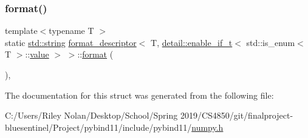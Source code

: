 \subsubsection{\texorpdfstring{format()}{format()}}
{\footnotesize\ttfamily template$<$typename T $>$ \\
static \mbox{\hyperlink{_s_d_l__opengl__glext_8h_ab4ccfaa8ab0e1afaae94dc96ef52dde1}{std\+::string}} \mbox{\hyperlink{structformat__descriptor}{format\+\_\+descriptor}}$<$ T, \mbox{\hyperlink{detail_2common_8h_a012819c9e8b5e04872a271f50f8b8196}{detail\+::enable\+\_\+if\+\_\+t}}$<$ std\+::is\+\_\+enum$<$ T $>$\+::\mbox{\hyperlink{_s_d_l__opengl__glext_8h_a8ad81492d410ff2ac11f754f4042150f}{value}} $>$ $>$\+::\mbox{\hyperlink{_s_d_l__audio_8h_a71a65ffd977afe9c3fef116a5bc9ee27}{format}} (\begin{DoxyParamCaption}{ }\end{DoxyParamCaption})\hspace{0.3cm}{\ttfamily [inline]}, {\ttfamily [static]}}



The documentation for this struct was generated from the following file\+:\begin{DoxyCompactItemize}
\item 
C\+:/\+Users/\+Riley Nolan/\+Desktop/\+School/\+Spring 2019/\+C\+S4850/git/finalproject-\/bluesentinel/\+Project/pybind11/include/pybind11/\mbox{\hyperlink{numpy_8h}{numpy.\+h}}\end{DoxyCompactItemize}
